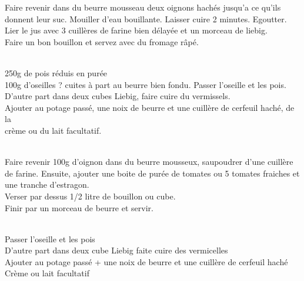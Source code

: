 \begin{minipage}[c]{\textwidth}
Faire revenir dans du beurre mousseau deux oignons hachés jusqu'a ce qu'ils donnent leur suc. Mouiller d'eau bouillante. Laisser cuire 2 minutes. Egoutter. Lier le jus avec 3 cuillères de farine bien délayée et un morceau de liebig.\\
Faire un bon bouillon et servez avec du fromage râpé.\\
\\

\end{minipage}

\begin{minipage}[c]{\textwidth}
250g de pois réduis en purée\\
100g d’oseilles ? cuites à part au beurre bien fondu. Passer l'oseille et les pois.\\
D’autre part dans deux cubes Liebig, faire cuire du vermissels.\\
Ajouter au potage passé, une noix de beurre et une cuillère de cerfeuil haché, de la\\
crème ou du lait facultatif.\\
\\

\end{minipage}

\begin{minipage}[c]{\textwidth}
Faire revenir 100g d'oignon dans du beurre mousseux, saupoudrer d’une cuillère de farine. Ensuite, ajouter une boite de purée de tomates ou 5 tomates fraiches et une tranche d'estragon.\\
Verser par dessus 1/2 litre de bouillon ou cube.\\
Finir par un morceau de beurre et servir.\\
\\

\end{minipage}

\begin{minipage}[c]{\textwidth}
Passer l'oseille et les pois\\
D’autre part dans deux cube Liebig faite cuire des vermicelles\\
Ajouter au potage passé + une noix de beurre et une cuillère de cerfeuil haché\\
Crème ou lait facultatif\\
\\

\end{minipage}

